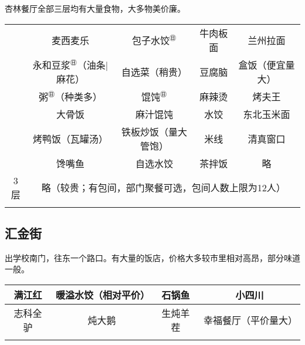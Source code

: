 杏林餐厅全部三层均有大量食物，大多物美价廉。
\begin{table}[H]
    \centering
    \begin{tabular}{|c|c|c|c|c|}
        \Xhline{1.2pt}
        \multirow{3}{*}{1层} & 麦西麦乐                                             & 包子水饺$^{㊐}$ %
                            & 牛肉板面                                             & 兰州拉面       \\
        \cline{2-5}
                            & 永和豆浆$^{㊐}$（油条|麻花）                                & 自选菜（稍贵）    %
                            & 豆腐脑                                              & 盒饭（便宜量大）   \\
        \cline{2-5}
                            & 粥$^{㊐}$（种类多）                                     & 馄饨$^{㊐}$   %
                            & 麻辣烫                                              & 烤夫王        \\
        \Xhline{1.2pt}
        \multirow{3}{*}{2层} & 大骨饭                                              & 麻汁馄饨       %
                            & 水饺                                               & 东北玉米面      \\
        \cline{2-5}
                            & 烤鸭饭（瓦罐汤）                                         & 铁板炒饭（量大管饱） %
                            & 米线                                               & 清真窗口       \\
        \cline{2-5}
                            & 馋嘴鱼                                              & 自选水饺       %
                            & 茶拌饭                                              & 略          \\
        \Xhline{1.2pt}
        3层\footnotemark     & \multicolumn{4}{c|}{略（较贵；有包间，部门聚餐可选，包间人数上限为12人）}              \\
        \Xhline{1.2pt}
    \end{tabular}
\end{table}

\subsection[汇金街]{汇金街\footnotemark}
出学校南门，往东一个路口。有大量的饭店，价格大多较市里相对高昂，部分味道一般。
\begin{table}[ht]
    \centering
    \begin{tabular}{|c|c|c|c|}
        \Xhline{1.2pt}
        满江红  & 暖溢水饺（相对平价） & 石锅鱼  & 小四川        \\
        \hline
        志科全驴 & 炖大鹅        & 生炖羊茬 & 幸福餐厅（平价量大） \\
        \Xhline{1.2pt}
    \end{tabular}
\end{table}

